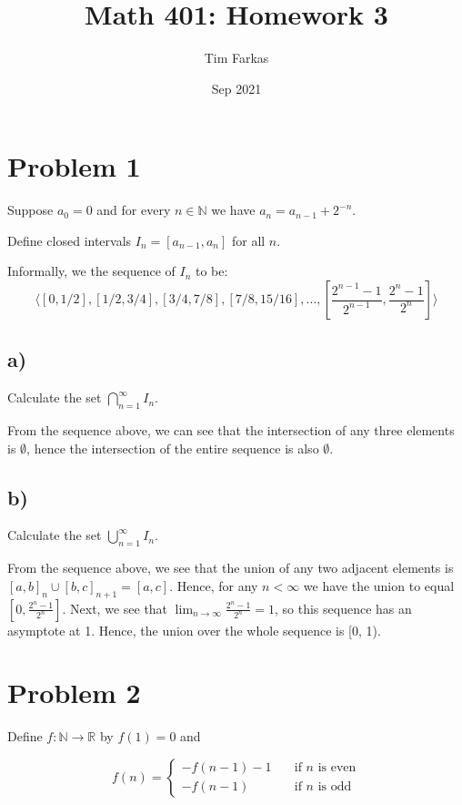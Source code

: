 \documentclass{article}
\title{Math 401: Homework 3}
\author{Tim Farkas}
\date{Sep 2021}
\newcommand{\R}{\mathbb{R}}
\newcommand{\N}{\mathbb{N}}
\begin{document}
\maketitle

\section*{Problem 1}

Suppose $a_0 = 0$ and for every $n \in \N$ we have $a_n = a_{n-1} + 2^{-n}$.

Define closed intervals $I_n = [a_{n-1}, a_n]$ for all $n$. 

Informally, we the sequence of $I_n$ to be:
\begin{equation*}
  \langle[0, 1/2], [1/2, 3/4], [3/4, 7/8], [7/8, 15/16], \dots , [\frac{2^{n - 1} - 1}{2^{n-1}}, \frac{2^n - 1}{2^n}]\rangle
\end{equation*}

\subsection*{a)} Calculate the set $\bigcap_{n = 1}^\infty I_n$.

From the sequence above, we can see that the intersection of any three elements is $\emptyset$, hence the intersection of the entire sequence is also $\emptyset$. 

\subsection*{b)} Calculate the set $\bigcup_{n = 1}^\infty I_n$. 

From the sequence above, we see that the union of any two adjacent elements is $[a, b]_n \cup [b, c]_{n+1} = [a, c].$ Hence, for any $n < \infty$ we have the union to equal $[0, \frac{2^n-1}{2^n}]$.
Next, we see that $\lim_{n \rightarrow \infty} \frac{2^n-1}{2^n} = 1$, so this sequence has an asymptote at 1.
Hence, the union over the whole sequence is [0, 1). 

\newpage

\section*{Problem 2}

Define $f: \N \rightarrow \R$ by $f(1) = 0$ and

\begin{equation*}
  f(n) = \left\{ \begin{array}{ll}
      -f(n-1) - 1 & \quad \text{if $n$ is even} \\
      -f(n-1) & \quad \text{if $n$ is odd}
  \end{array}\right.
\end{equation*}
\end{document}
